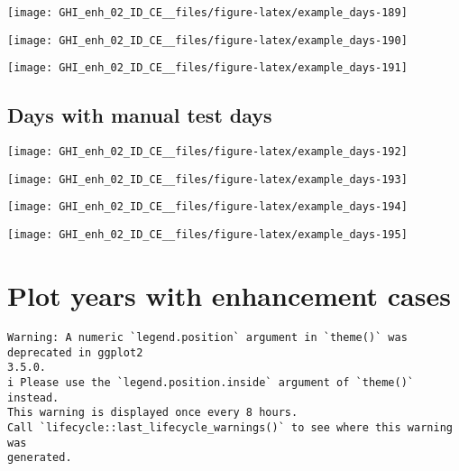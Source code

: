 \documentclass[
  10pt,
  a4paper,oneside]{article}
\begin{document}
\begin{center}\texttt{[image: GHI\_enh\_02\_ID\_CE\_\_files/figure-latex/example\_days-189]} \end{center}

\begin{center}\texttt{[image: GHI\_enh\_02\_ID\_CE\_\_files/figure-latex/example\_days-190]} \end{center}

\begin{center}\texttt{[image: GHI\_enh\_02\_ID\_CE\_\_files/figure-latex/example\_days-191]} \end{center}

\FloatBarrier

\hypertarget{days-with-manual-test-days}{%
\subsection{Days with manual test days}\label{days-with-manual-test-days}}

\begin{center}\texttt{[image: GHI\_enh\_02\_ID\_CE\_\_files/figure-latex/example\_days-192]} \end{center}

\begin{center}\texttt{[image: GHI\_enh\_02\_ID\_CE\_\_files/figure-latex/example\_days-193]} \end{center}

\begin{center}\texttt{[image: GHI\_enh\_02\_ID\_CE\_\_files/figure-latex/example\_days-194]} \end{center}

\begin{center}\texttt{[image: GHI\_enh\_02\_ID\_CE\_\_files/figure-latex/example\_days-195]} \end{center}

\newpage
\FloatBarrier

\hypertarget{plot-years-with-enhancement-cases}{%
\section{Plot years with enhancement cases}\label{plot-years-with-enhancement-cases}}

\begin{verbatim}
Warning: A numeric `legend.position` argument in `theme()` was deprecated in ggplot2
3.5.0.
i Please use the `legend.position.inside` argument of `theme()` instead.
This warning is displayed once every 8 hours.
Call `lifecycle::last_lifecycle_warnings()` to see where this warning was
generated.
\end{verbatim}
\end{document}
